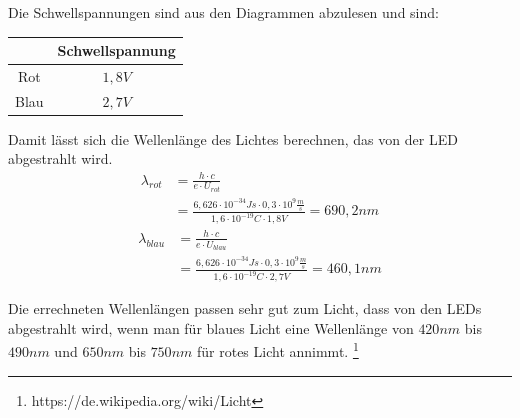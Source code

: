        Die Schwellspannungen sind aus den Diagrammen abzulesen und sind:
       \begin{center}
       \begin{tabular}{c|c}
       &Schwellspannung\\ \hline
       Rot & $1,8 V$ \\
       Blau & $2,7 V$
       \end{tabular}
       \end{center}
       Damit lässt sich die Wellenlänge des Lichtes berechnen, das von der LED abgestrahlt wird.
       \begin{align*}
       		\lambda_{rot} & = \frac{h \cdot c}{e \cdot U_{rot}} \\
            & = \frac{6,626 \cdot 10^{-34} Js \cdot 0,3 \cdot 10^9 \frac{m}{s}}{1,6 \cdot 10^{-19} C \cdot 1,8 V} = 690,2 nm
       \end{align*} 
       \begin{align*}
       		\lambda_{blau} & = \frac{h \cdot c}{e \cdot U_{blau}} \\
            & = \frac{6,626 \cdot 10^{-34} Js \cdot 0,3 \cdot 10^9 \frac{m}{s}}{1,6 \cdot 10^{-19} C \cdot 2,7 V} = 460,1 nm
       \end{align*}
       
       Die errechneten Wellenlängen passen sehr gut zum Licht, dass von den LEDs abgestrahlt wird, wenn man für blaues Licht eine Wellenlänge von $420nm$ bis $490nm$ und $650nm$ bis $750nm$ für rotes Licht annimmt. \footnote{https://de.wikipedia.org/wiki/Licht}
	\pagebreak
